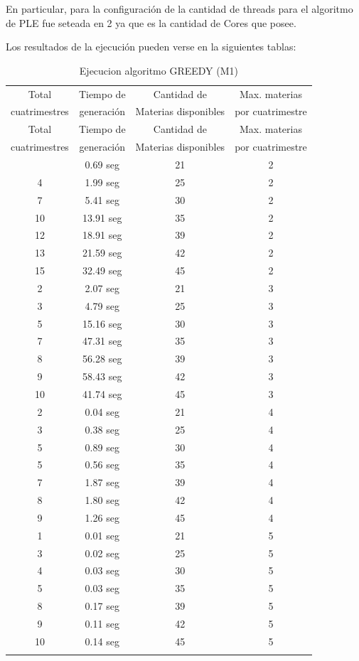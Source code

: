 \documentclass[a4paper]{article}
\begin{document}
En particular, para la configuración de la cantidad de threads para el algoritmo de PLE fue seteada en 2 ya que es la cantidad de Cores que posee.

Los resultados de la ejecución pueden verse en la siguientes tablas:

\begin{longtable}{| c | c | c | c |}
\hline
Total   & Tiempo de & Cantidad de & Max. materias  \\
cuatrimestres &  generación &  Materias disponibles & por cuatrimestre \\
\hline \hline
\endfirsthead
\hline
Total   & Tiempo de & Cantidad de & Max. materias  \\
cuatrimestres &  generación &  Materias disponibles & por cuatrimestre \\
\hline \hline
\endhead
\endfoot
\endlastfoot
2 & 0.69 seg & 21 & 2\\
\hline
4 & 1.99 seg & 25 & 2\\
\hline
7 & 5.41 seg & 30 & 2\\
\hline
10 & 13.91 seg & 35 & 2\\
\hline
12 & 18.91 seg & 39 & 2\\
\hline
13 & 21.59 seg & 42 & 2\\
\hline
15 & 32.49 seg & 45 & 2\\
\hline
2 & 2.07 seg & 21 & 3\\
\hline
3 & 4.79 seg & 25 & 3\\
\hline
5 & 15.16 seg & 30 & 3\\
\hline
7 & 47.31 seg & 35 & 3\\
\hline
8 & 56.28 seg & 39 & 3\\
\hline
9 & 58.43 seg & 42 & 3\\
\hline
10 & 41.74 seg & 45 & 3\\
\hline
2 & 0.04 seg & 21 & 4\\
\hline
3 & 0.38 seg & 25 & 4\\
\hline
5 & 0.89 seg & 30 & 4\\
\hline
5 & 0.56 seg & 35 & 4\\
\hline
7 & 1.87 seg & 39 & 4\\
\hline
8 & 1.80 seg & 42 & 4\\
\hline
9 & 1.26 seg & 45 & 4\\
\hline
1 & 0.01 seg & 21 & 5\\
\hline
3 & 0.02 seg & 25 & 5\\
\hline
4 & 0.03 seg & 30 & 5\\
\hline
5 & 0.03 seg & 35 & 5\\
\hline
8 & 0.17 seg & 39 & 5\\
\hline
9 & 0.11 seg & 42 & 5\\
\hline
10 & 0.14 seg & 45 & 5\\
\hline
\caption{Ejecucion algoritmo GREEDY (M1)}
\end{longtable}
\end{document}
